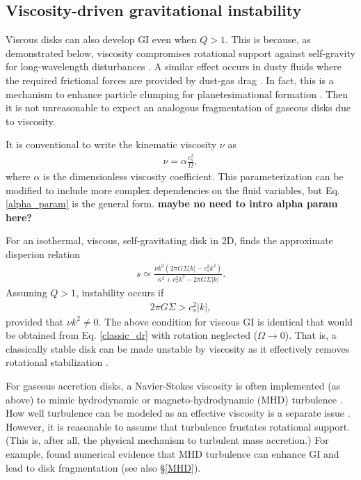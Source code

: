 \documentclass[iop, numberedappendix]{emulateapj}
\begin{document}

\subsection{Viscosity-driven gravitational instability}\label{visc_gi}
Viscous disks can also develop GI even when $Q>1$. This is because, as 
demonstrated below, viscosity compromises rotational support against  
self-gravity for long-wavelength disturbances 
\citep{lynden-bell74,willerding92,gammie96}. A similar effect   
occurs in dusty fluids where the required frictional forces are 
provided by dust-gas drag \citep{ward00, takahashi14}. In fact, this
is a mechanism to enhance particle clumping for planetesimational
formation %
\citep{youdin11}. Then it is not unreasonable to expect an analogous
fragmentation of gaseous disks due to viscosity.   

It is conventional to write the kinematic viscosity $\nu$ as   
\begin{align}\label{alpha_param}
  \nu  = \alpha \frac{c_s^2}{\Omega}, %
\end{align}
where $\alpha$ is the dimensionless viscosity
coefficient. This
parameterization can be modified to include more complex dependencies on the
fluid variables, but Eq. \ref{alpha_param} is the general form. 
{\bf maybe no need to intro alpha param here?}

For an isothermal, viscous, self-gravitating disk in 2D,
\cite{gammie96} finds the approximate disperion relation   
\begin{align}
s \simeq \frac{\nu k^2\left(2\pi G\Sigma |k| -
  c_s^2k^2\right)}{\kappa^2 + c_s^2k^2 - 2\pi G\Sigma|k|}. 
\end{align}
Assuming $Q>1$, instability occurs if 
\begin{align*}
  2\pi G \Sigma > c_s^2|k|,
\end{align*}
provided that $\nu k^2\neq0$. The above condition for viscous GI is 
identical that would be obtained from Eq. \ref{classic_dr} with
rotation neglected ($\Omega\to 0$). That is, a classically stable
disk can be made unstable by viscosity as it effectively removes
rotational stabilization \citep{lynden-bell74}.  

For gaseous accretion disks, a Navier-Stokes viscosity is often
implemented (as above) to mimic hydrodynamic or magneto-hydrodynamic
(MHD) turbulence \citep{shakura73}. How well turbulence can be modeled
as an effective viscosity is a separate issue 
\citep{balbus99}. However, it is reasonable to assume that turbulence
frustates rotational support. (This is, after all, the physical
mechanism to turbulent mass accretion.) 
For example, \cite{fromang05} found numerical evidence that MHD
turbulence can enhance GI and lead to disk fragmentation (see also
\S\ref{MHD}). 
\end{document}
